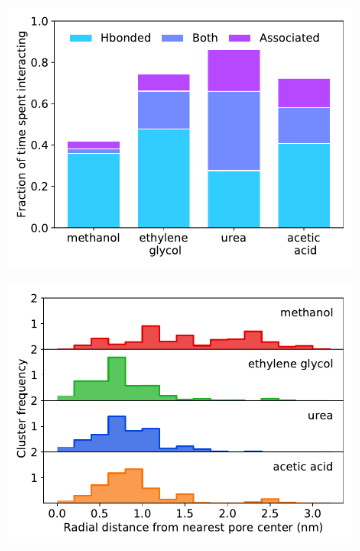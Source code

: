 \documentclass[journal=jpcbfk,manuscript=article]{achemso}
\begin{document}
  \begin{figure}
  \centering
  \begin{subfigure}{0.49\textwidth}
  \includegraphics[width=\textwidth]{hbonds_assoc_summary.pdf}
  \caption{}\label{fig:hbonds_assoc_summary}
  \end{subfigure}
  \begin{subfigure}{0.49\textwidth}
  \includegraphics[width=\textwidth]{rdf_summary.pdf}
  \caption{}\label{fig:rdf_summary}
  \end{subfigure}
  \begin{subfigure}{0.49\textwidth}

\end{subfigure}
\end{figure}
\end{document}
